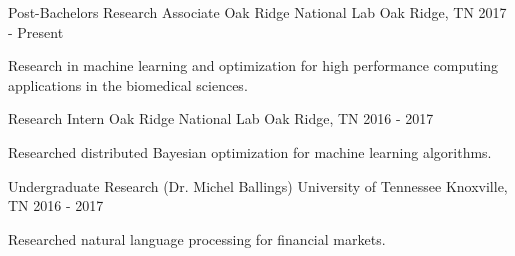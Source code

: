 \begin{cventries}
  \cventry
    {Post-Bachelors Research Associate}
    {Oak Ridge National Lab}
    {Oak Ridge, TN}
    {2017 - Present}
    {
      \begin{cvitems}
        \item {Research in machine learning and optimization for high 
        performance computing applications in the biomedical sciences.}
      \end{cvitems}
    }
  \cventry
    {Research Intern}
    {Oak Ridge National Lab}
    {Oak Ridge, TN}
    {2016 - 2017}
    {
      \begin{cvitems}
        \item {Researched distributed Bayesian optimization for machine
        learning algorithms.}
      \end{cvitems}
    }
  \cventry
    {Undergraduate Research (Dr. Michel Ballings)}
    {University of Tennessee}
    {Knoxville, TN}
    {2016 - 2017}
    {
      \begin{cvitems}
        \item {Researched natural language processing for financial markets.}
      \end{cvitems} 
    }
\end{cventries}

